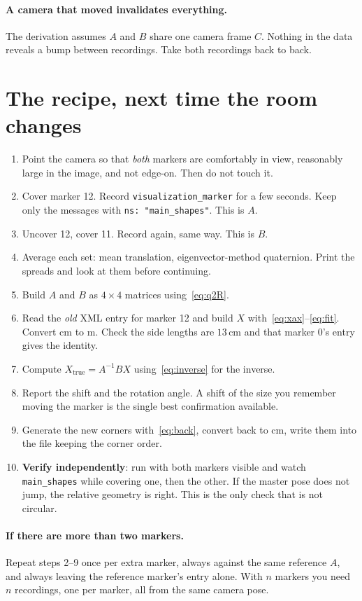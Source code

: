 \documentclass[11pt,a4paper]{article}
\begin{document}
\paragraph{A camera that moved invalidates everything.} The derivation assumes $A$ and
$B$ share one camera frame $C$. Nothing in the data reveals a bump between recordings.
Take both recordings back to back.

\section{The recipe, next time the room changes}

\begin{enumerate}[leftmargin=*]
\item Point the camera so that \emph{both} markers are comfortably in view, reasonably
      large in the image, and not edge-on. Then do not touch it.

\item Cover marker 12. Record \texttt{visualization\_marker} for a few seconds. Keep only
      the messages with \texttt{ns: "main\_shapes"}. This is $A$.

\item Uncover 12, cover 11. Record again, same way. This is $B$.

\item Average each set: mean translation, eigenvector-method quaternion. Print the
      spreads and look at them before continuing.

\item Build $A$ and $B$ as $4\times4$ matrices using~\eqref{eq:q2R}.

\item Read the \emph{old} XML entry for marker 12 and build $X$
      with~\eqref{eq:xax}--\eqref{eq:fit}. Convert cm to m. Check the side lengths are
      $13$\,cm and that marker 0's entry gives the identity.

\item Compute $X_{\text{true}} = A^{-1} B X$ using~\eqref{eq:inverse} for the inverse.

\item Report the shift and the rotation angle. A shift of the size you remember moving
      the marker is the single best confirmation available.

\item Generate the new corners with~\eqref{eq:back}, convert back to cm, write them into
      the file keeping the corner order.

\item \textbf{Verify independently}: run with both markers visible and watch
      \texttt{main\_shapes} while covering one, then the other. If the master pose does
      not jump, the relative geometry is right. This is the only check that is not
      circular.
\end{enumerate}

\paragraph{If there are more than two markers.} Repeat steps 2--9 once per extra marker,
always against the same reference $A$, and always leaving the reference marker's entry
alone. With $n$ markers you need $n$ recordings, one per marker, all from the same
camera pose.
\end{document}
